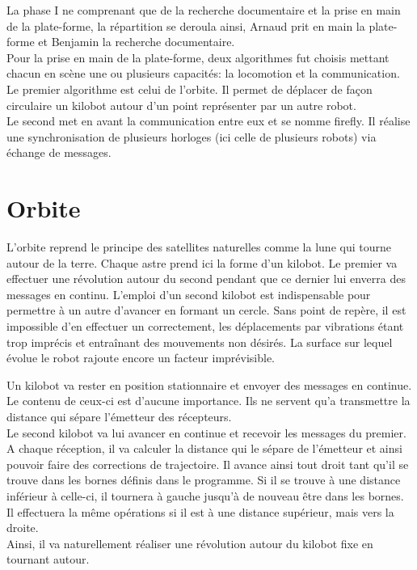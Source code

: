 \documentclass[a4paper,8pt]{report}
\begin{document}
\bigskip
La phase I ne comprenant que de la recherche documentaire et la prise en main de la plate-forme, la r\'epartition se deroula ainsi, Arnaud prit en main la plate-forme et Benjamin la recherche documentaire.\\
Pour la prise en main de la plate-forme, deux algorithmes fut choisis mettant chacun en scène une ou plusieurs capacités: la locomotion et la communication.\\
Le premier algorithme est celui de l'orbite. Il permet de déplacer de façon circulaire un kilobot autour d'un point représenter par un autre robot.\\
Le second met en avant la communication entre eux et se nomme firefly. Il réalise une synchronisation de plusieurs horloges (ici celle de plusieurs robots) via échange de messages.\\

\section*{Orbite}\label{sec:name}

L'orbite reprend le principe des satellites naturelles comme la lune qui tourne autour de la terre. Chaque astre prend ici la forme d'un kilobot. Le premier va effectuer une révolution autour du second pendant que ce dernier lui enverra des messages en continu. L'emploi d'un second kilobot est indispensable pour permettre à un autre d'avancer en formant un cercle. Sans point de repère, il est impossible d'en effectuer un correctement, les déplacements par vibrations étant trop imprécis et entraînant des mouvements non désirés. La surface sur lequel évolue le robot rajoute encore un facteur imprévisible.

Un kilobot va rester en position stationnaire et envoyer des messages en continue. Le contenu de ceux-ci est d'aucune importance. Ils ne servent qu'a transmettre la distance qui sépare l’émetteur des récepteurs.\\
Le second kilobot va lui avancer en continue et recevoir les messages du premier. A chaque réception, il va calculer la distance qui le sépare de l'émetteur et ainsi pouvoir faire des corrections de trajectoire. Il avance ainsi tout droit tant qu'il se trouve dans les bornes définis dans le programme. Si il se trouve à une distance inférieur à celle-ci, il tournera à gauche jusqu’à de nouveau être dans les bornes. Il effectuera la même opérations si il est à une distance supérieur, mais vers la droite.\\
Ainsi, il va naturellement réaliser une révolution autour du kilobot fixe en tournant autour.\\
\end{document}
